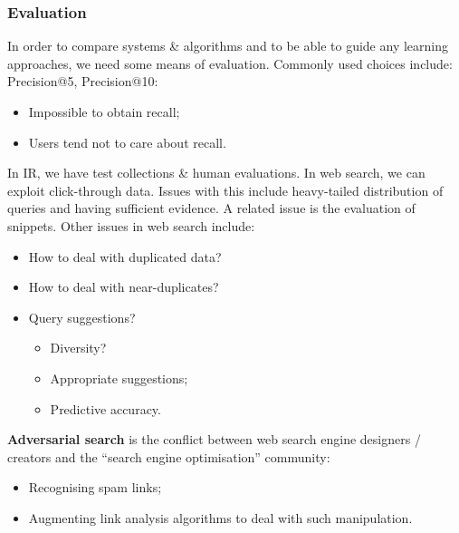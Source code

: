 \documentclass[a4paper,11pt]{article}
\begin{document}
\subsubsection{Evaluation}
In order to compare systems \& algorithms and to be able to guide any learning approaches, we need some means of evaluation.
Commonly used choices include: Precision@5, Precision@10:
\begin{itemize}
    \item   Impossible to obtain recall;
    \item   Users tend not to care about recall.
\end{itemize}

In IR, we have test collections \& human evaluations.
In web search, we can exploit click-through data.
Issues with this include heavy-tailed distribution of queries and having sufficient evidence.
A related issue is the evaluation of snippets.
Other issues in web search include:
\begin{itemize}
    \item   How to deal with duplicated data?
    \item   How to deal with near-duplicates?
    \item   Query suggestions?
            \begin{itemize}
                \item   Diversity?
                \item   Appropriate suggestions;
                \item   Predictive accuracy.
            \end{itemize}
\end{itemize}

\textbf{Adversarial search} is the conflict between web search engine designers / creators and the ``search engine optimisation'' community:
\begin{itemize}
    \item   Recognising spam links;
    \item   Augmenting link analysis algorithms to deal with such manipulation.
\end{itemize}
\end{document}
